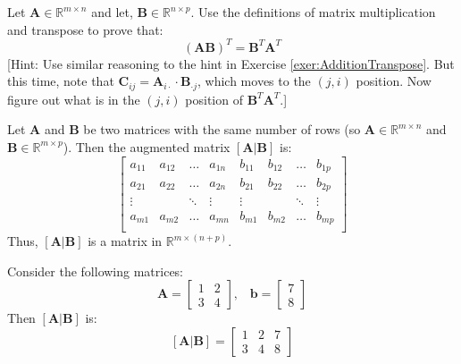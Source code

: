 \begin{exercise} Let $\mathbf{A} \in \mathbb{R}^{m \times n}$ and let, $\mathbf{B} \in \mathbb{R}^{n \times p}$. Use the definitions of matrix multiplication and transpose to prove that:
\begin{equation}
(\mathbf{A}\mathbf{B})^T = \mathbf{B}^T\mathbf{A}^T
\end{equation}
[Hint: Use similar reasoning to the hint in Exercise \ref{exer:AdditionTranspose}. But this time, note that $\mathbf{C}_{ij} = \mathbf{A}_{i\cdot} \cdot \mathbf{B}_{\cdot j}$, which moves to the $(j,i)$ position. Now figure out what is in the $(j,i)$ position of $\mathbf{B}^T\mathbf{A}^T$.]
\end{exercise}

Let $\mathbf{A}$ and $\mathbf{B}$ be two matrices with the same number of rows (so $\mathbf{A} \in \mathbb{R}^{m \times n}$ and $\mathbf{B} \in \mathbb{R}^{m \times p}$). Then the augmented matrix $\left[\mathbf{A}|\mathbf{B}\right]$ is:
\begin{equation}
\left[
\begin{array}{cccc|cccc}
a_{11} & a_{12} & \dots & a_{1n} & b_{11} & b_{12} & \dots & b_{1p}\\
a_{21} & a_{22} & \dots & a_{2n} & b_{21} & b_{22} & \dots & b_{2p}\\
\vdots & & \ddots & \vdots & \vdots & & \ddots & \vdots\\
a_{m1} & a_{m2} & \dots & a_{mn} & b_{m1} & b_{m2} & \dots & b_{mp}\\
\end{array}
\right]
\end{equation}
Thus, $\left[\mathbf{A}|\mathbf{B}\right]$ is a matrix in $\mathbb{R}^{m \times (n + p)}$. 

\begin{example} Consider the following matrices:
\begin{displaymath}
\mathbf{A} = \left[ 
\begin{array}{cc}
1 & 2\\
3 & 4
\end{array}
\right],\;\;\;\mathbf{b} = \left[
\begin{array}{c}
7\\
8
\end{array}
\right]
\end{displaymath}
Then $\left[\mathbf{A}|\mathbf{B}\right]$ is:
\begin{displaymath}
\left[\mathbf{A}|\mathbf{B}\right] = \left[ 
\begin{array}{cc|c}
1 & 2 & 7\\
3 & 4 & 8
\end{array}
\right]
\end{displaymath}
\end{example}

